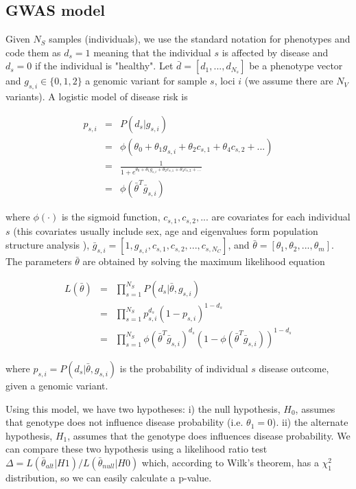 \subsection{GWAS model}

Given $N_S$ samples (individuals), we use the standard notation for phenotypes and code them as $d_s=1$ meaning that the individual $s$ is affected by disease and $d_s=0$ if the individual is "healthy". Let $\bar{d} = [d_1, ..., d_{N_s}]$ be a phenotype vector and $g_{s,i} \in \{0,1,2\}$ a genomic variant for sample $s$, loci $i$ (we assume there are $N_V$ variants). A logistic model of disease risk \cite{balding2006tutorial} is

\begin{eqnarray*}
	p_{s,i} & = & P( d_s | g_{s,i} ) \\
	& = & \phi( \theta_0 + \theta_1 g_{s,i} + \theta_2 c_{s,1} + \theta_4 c_{s,2} + ... ) \\
	& = & \frac{1}{1 + e^{\theta_0 + \theta_1 g_{s,i} + \theta_2 c_{s,1} + \theta_4 c_{s,2} + ...}} \\
	& = & \phi( \bar{\theta}^T \bar{g}_{s,i})
\end{eqnarray*}

where $\phi(\cdot)$ is the sigmoid function, $c_{s,1}, c_{s,2}, ... $ are covariates for each individual $s$ (this covariates usually include sex, age and eigenvalues form population structure analysis \cite{price2006principal}), $\bar{g}_{s,i} = [ 1, g_{s,i} , c_{s,1}, c_{s,2}, ... , c_{s,N_C} ]$, and $\bar{\theta} = [\theta_1, \theta_2, ..., \theta_m] $. The parameters $\bar{\theta}$ are obtained by solving the maximum likelihood equation

\begin{eqnarray*}
	L( \bar{\theta} ) & = & \prod_{s=1}^{N_S}{ P( d_s | \bar{\theta}, g_{s,i} ) } \\
	& = & \prod_{s=1}^{N_S}{ p_{s,i}^{d_s} (1-p_{s,i})^{1-d_s} } \\
	& = & \prod_{s=1}^{N_S}{ \phi( \bar{\theta}^T \bar{g}_{s,i})^{d_s} (1-\phi( \bar{\theta}^T \bar{g}_{s,i}))^{1-d_s} }
\end{eqnarray*}

where $p_{s,i} = P( d_s | \bar{\theta}, g_{s,i} )$ is the probability of individual $s$ disease outcome, given a genomic variant.

Using this model, we have two hypotheses: i) the null hypothesis, $H_0$, assumes that genotype does not influence disease probability (i.e. $\theta_1 = 0$). ii) the alternate hypothesis, $H_1$, assumes that the genotype does influences disease probability. We can compare these two hypothesis using a likelihood ratio test $\Delta = L( \bar{\theta}_{alt} | H1 ) / L( \bar{\theta}_{null} | H0 ) $ which, according to Wilk's theorem, has a $\chi^2_1$ distribution, so we can easily calculate a p-value.

